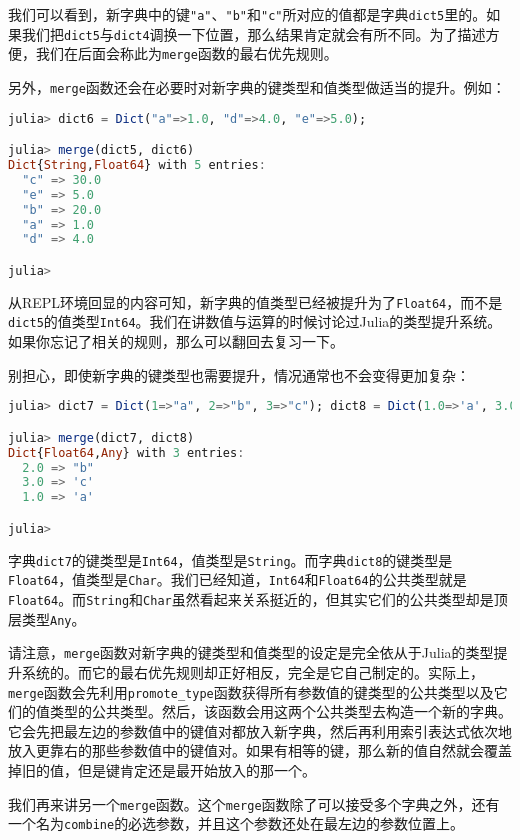 我们可以看到，新字典中的键\verb|"a"|、\verb|"b"|和\verb|"c"|所对应的值都是字典\verb|dict5|里的。如果我们把\verb|dict5|与\verb|dict4|调换一下位置，那么结果肯定就会有所不同。为了描述方便，我们在后面会称此为\verb|merge|函数的最右优先规则。

另外，\verb|merge|函数还会在必要时对新字典的键类型和值类型做适当的提升。例如：
\begin{lstlisting}[language=julia]
julia> dict6 = Dict("a"=>1.0, "d"=>4.0, "e"=>5.0);

julia> merge(dict5, dict6)
Dict{String,Float64} with 5 entries:
  "c" => 30.0
  "e" => 5.0
  "b" => 20.0
  "a" => 1.0
  "d" => 4.0

julia> 
\end{lstlisting}

从REPL环境回显的内容可知，新字典的值类型已经被提升为了\verb|Float64|，而不是\verb|dict5|的值类型\verb|Int64|。我们在讲数值与运算的时候讨论过Julia的类型提升系统。如果你忘记了相关的规则，那么可以翻回去复习一下。

别担心，即使新字典的键类型也需要提升，情况通常也不会变得更加复杂：
\begin{lstlisting}[language=julia]
julia> dict7 = Dict(1=>"a", 2=>"b", 3=>"c"); dict8 = Dict(1.0=>'a', 3.0=>'c');

julia> merge(dict7, dict8)
Dict{Float64,Any} with 3 entries:
  2.0 => "b"
  3.0 => 'c'
  1.0 => 'a'

julia> 
\end{lstlisting}

字典\verb|dict7|的键类型是\verb|Int64|，值类型是\verb|String|。而字典\verb|dict8|的键类型是\verb|Float64|，值类型是\verb|Char|。我们已经知道，\verb|Int64|和\verb|Float64|的公共类型就是\verb|Float64|。而\verb|String|和\verb|Char|虽然看起来关系挺近的，但其实它们的公共类型却是顶层类型\verb|Any|。

请注意，\verb|merge|函数对新字典的键类型和值类型的设定是完全依从于Julia的类型提升系统的。而它的最右优先规则却正好相反，完全是它自己制定的。实际上，\verb|merge|函数会先利用\verb|promote_type|函数获得所有参数值的键类型的公共类型以及它们的值类型的公共类型。然后，该函数会用这两个公共类型去构造一个新的字典。它会先把最左边的参数值中的键值对都放入新字典，然后再利用索引表达式依次地放入更靠右的那些参数值中的键值对。如果有相等的键，那么新的值自然就会覆盖掉旧的值，但是键肯定还是最开始放入的那一个。

我们再来讲另一个\verb|merge|函数。这个\verb|merge|函数除了可以接受多个字典之外，还有一个名为\verb|combine|的必选参数，并且这个参数还处在最左边的参数位置上。


